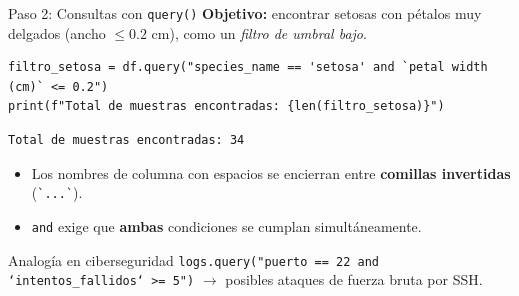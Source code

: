 \documentclass[10pt,aspectratio=169]{beamer}
\begin{document}
\begin{frame}[fragile]{Paso 2: Consultas con \texttt{query()}}
  \textbf{Objetivo:} encontrar setosas con pétalos muy delgados (ancho $\le 0.2$ cm), como un \emph{filtro de umbral bajo}.
  \begin{lstlisting}
filtro_setosa = df.query("species_name == 'setosa' and `petal width (cm)` <= 0.2")
print(f"Total de muestras encontradas: {len(filtro_setosa)}")
  \end{lstlisting}
  \begin{lstlisting}[style=salida]
Total de muestras encontradas: 34
  \end{lstlisting}
  \medskip
  \begin{itemize}
    \item Los nombres de columna con espacios se encierran entre \textbf{comillas invertidas} (\texttt{\`{}...\`{}}).
    \item \texttt{and} exige que \textbf{ambas} condiciones se cumplan simultáneamente.
  \end{itemize}
  \begin{exampleblock}{Analogía en ciberseguridad}
    \small\texttt{logs.query("puerto == 22 and `intentos\_fallidos` >= 5")} \; $\to$ posibles ataques de fuerza bruta por SSH.
  \end{exampleblock}
\end{frame}
\end{document}
